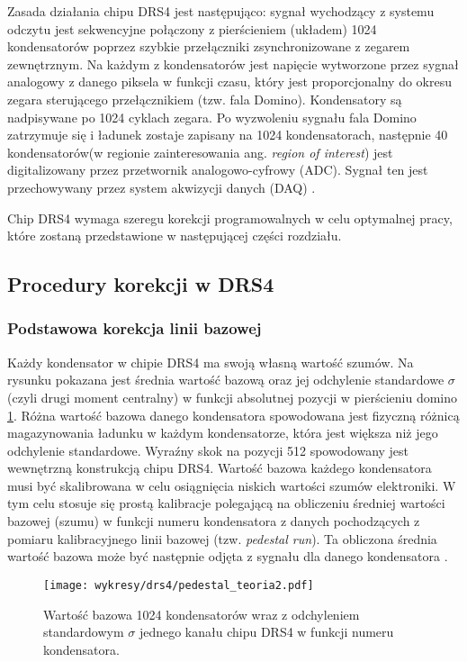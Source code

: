 \documentclass[a4paper,11pt,twoside]{article}
\begin{document}
Zasada działania chipu DRS4 jest następująco: sygnał wychodzący z systemu odczytu jest sekwencyjne połączony z pierścieniem (układem) 1024 kondensatorów poprzez szybkie przełączniki zsynchronizowane z zegarem zewnętrznym. Na każdym z kondensatorów jest napięcie wytworzone przez sygnał analogowy z danego piksela w funkcji czasu, który jest proporcjonalny do okresu zegara sterującego przełącznikiem (tzw. fala Domino). Kondensatory są nadpisywane po 1024 cyklach zegara. Po wyzwoleniu sygnału fala Domino zatrzymuje się i ładunek zostaje zapisany na 1024 kondensatorach, następnie 40 kondensatorów(w regionie zainteresowania ang. \textsl{region of interest}) jest digitalizowany przez przetwornik analogowo-cyfrowy (ADC). Sygnał ten jest przechowywany przez system akwizycji danych (DAQ) \cite{drs4_psi}. 

Chip DRS4 wymaga szeregu korekcji programowalnych w celu optymalnej pracy, które zostaną przedstawione w następującej części rozdziału.
\subsection{Procedury korekcji w DRS4}
\subsubsection{Podstawowa korekcja linii bazowej}
Każdy kondensator w chipie DRS4 ma swoją własną wartość szumów. Na rysunku pokazana jest średnia wartość bazową oraz jej odchylenie standardowe $\sigma$ (czyli drugi moment centralny) w funkcji absolutnej pozycji w pierścieniu domino \ref{fig:baseline_cap}. Różna wartość bazowa danego kondensatora spowodowana jest fizyczną różnicą magazynowania ładunku w każdym kondensatorze, która jest większa niż jego odchylenie standardowe. Wyraźny skok na pozycji 512 spowodowany jest wewnętrzną konstrukcją chipu DRS4. Wartość bazowa każdego kondensatora musi być skalibrowana w celu osiągnięcia niskich wartości szumów elektroniki. W tym celu stosuje się prostą kalibracje polegającą na obliczeniu średniej wartości bazowej (szumu) w funkcji numeru kondensatora z danych pochodzących z pomiaru kalibracyjnego linii bazowej (tzw. \textsl{pedestal run}). Ta obliczona średnia wartość bazowa może być następnie odjęta z sygnału dla danego kondensatora \cite{drs4_magic}. 
\begin{figure}[H] 
\centering
\texttt{[image: wykresy/drs4/pedestal\_teoria2.pdf]}
\caption{Wartość bazowa 1024 kondensatorów wraz z odchyleniem standardowym $\sigma$ jednego kanału chipu DRS4 w funkcji numeru kondensatora.}
\label{fig:baseline_cap}
\end{figure}
\end{document}
